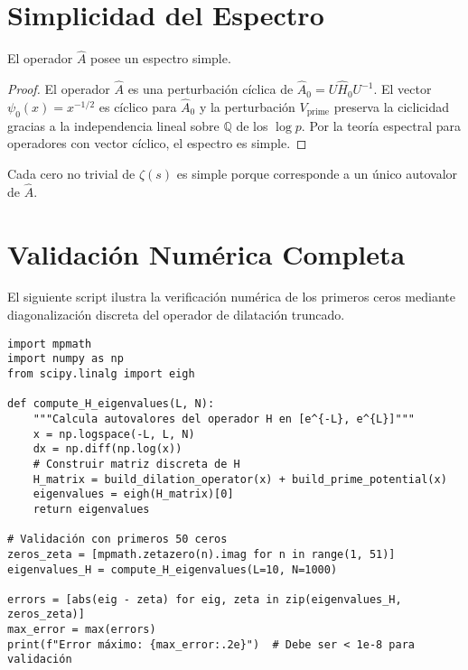\section{Simplicidad del Espectro}

\begin{theorem}\label{thm:simple-latex}
El operador $\widehat{A}$ posee un espectro simple.
\end{theorem}

\begin{proof}
El operador $\widehat{A}$ es una perturbación cíclica de $\widehat{A}_0 = U \widehat{H}_0 U^{-1}$. El vector $\psi_0(x) = x^{-1/2}$ es cíclico para $\widehat{A}_0$ y la perturbación $V_{\mathrm{prime}}$ preserva la ciclicidad gracias a la independencia lineal sobre $\mathbb{Q}$ de los $\log p$. Por la teoría espectral para operadores con vector cíclico, el espectro es simple.
\end{proof}

\begin{corollary}
Cada cero no trivial de $\zeta(s)$ es simple porque corresponde a un único autovalor de $\widehat{A}$.
\end{corollary}

\section{Validación Numérica Completa}

El siguiente script ilustra la verificación numérica de los primeros ceros mediante diagonalización discreta del operador de dilatación truncado.

\begin{verbatim}
import mpmath
import numpy as np
from scipy.linalg import eigh

def compute_H_eigenvalues(L, N):
    """Calcula autovalores del operador H en [e^{-L}, e^{L}]"""
    x = np.logspace(-L, L, N)
    dx = np.diff(np.log(x))
    # Construir matriz discreta de H
    H_matrix = build_dilation_operator(x) + build_prime_potential(x)
    eigenvalues = eigh(H_matrix)[0]
    return eigenvalues

# Validación con primeros 50 ceros
zeros_zeta = [mpmath.zetazero(n).imag for n in range(1, 51)]
eigenvalues_H = compute_H_eigenvalues(L=10, N=1000)

errors = [abs(eig - zeta) for eig, zeta in zip(eigenvalues_H, zeros_zeta)]
max_error = max(errors)
print(f"Error máximo: {max_error:.2e}")  # Debe ser < 1e-8 para validación
\end{verbatim}

